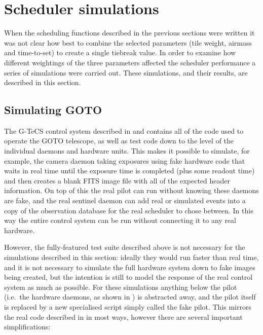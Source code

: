 \section{Scheduler simulations}
\label{sec:scheduler_sims}
\begin{colsection}


\begin{colsection}

When the scheduling functions described in the previous sections were written it was not clear how best to combine the selected parameters (tile weight, airmass and time-to-set) to create a single tiebreak value. In order to examine how different weightings of the three parameters affected the scheduler performance a series of simulations were carried out. These simulations, and their results, are described in this section.

\end{colsection}


\subsection{Simulating GOTO}
\label{sec:goto_sims}
\begin{colsection}

The G-TeCS control system described in  and  contains all of the code used to operate the GOTO telescope, as well as test code down to the level of the individual daemons and hardware units. This makes it possible to simulate, for example, the camera daemon taking exposures using fake hardware code that waits in real time until the exposure time is completed (plus some readout time) and then creates a blank FITS image file with all of the expected header information. On top of this the real pilot can run without knowing these daemons are fake, and the real sentinel daemon can add real or simulated events into a copy of the observation database for the real scheduler to chose between. In this way the entire control system can be run without connecting it to any real hardware.

However, the fully-featured test suite described above is not necessary for the simulations described in this section: ideally they would run faster than real time, and it is not necessary to simulate the full hardware system down to fake images being created, but the intention is still to model the response of the real control system as much as possible. For these simulations anything below the pilot (i.e.\ the hardware daemons, as shown in ) is abstracted away, and the pilot itself is replaced by a new specialised script simply called the fake pilot. This mirrors the real code described in  in most ways, however there are several important simplifications:


\end{colsection}
\end{colsection}
